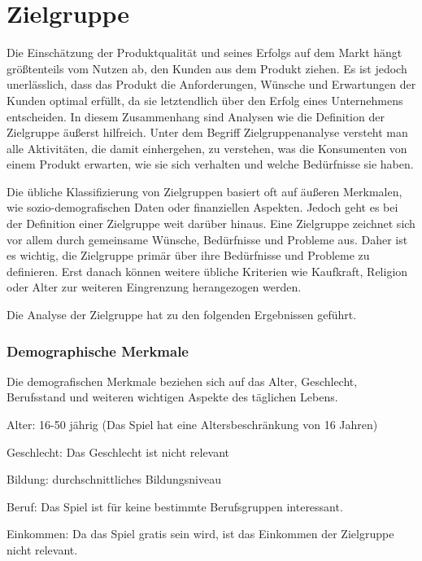 
\section{Zielgruppe}\label{sec:zielgruppe}

\renewcommand{\kapitelautor}{Autor: Nils Hubmann}

%
Die Einschätzung der Produktqualität und seines Erfolgs auf dem Markt hängt größtenteils vom Nutzen ab, den Kunden aus dem Produkt ziehen.
Es ist jedoch unerlässlich, dass das Produkt die Anforderungen, Wünsche und Erwartungen der Kunden optimal erfüllt, da sie letztendlich über den Erfolg eines Unternehmens entscheiden.
In diesem Zusammenhang sind Analysen wie die Definition der Zielgruppe äußerst hilfreich.
Unter dem Begriff Zielgruppenanalyse versteht man alle Aktivitäten, die damit einhergehen, zu verstehen, was die Konsumenten von einem Produkt erwarten, wie sie sich verhalten und welche Bedürfnisse sie haben.


Die übliche Klassifizierung von Zielgruppen basiert oft auf äußeren Merkmalen, wie sozio-demografischen Daten oder finanziellen Aspekten.
Jedoch geht es bei der Definition einer Zielgruppe weit darüber hinaus.
Eine Zielgruppe zeichnet sich vor allem durch gemeinsame Wünsche, Bedürfnisse und Probleme aus.
Daher ist es wichtig, die Zielgruppe primär über ihre Bedürfnisse und Probleme zu definieren.
Erst danach können weitere übliche Kriterien wie Kaufkraft, Religion oder Alter zur weiteren Eingrenzung herangezogen werden. 

Die Analyse der Zielgruppe hat zu den folgenden Ergebnissen geführt.

\subsubsection{Demographische Merkmale}\label{subsubsec:Demographische-Merkmale}

Die demografischen Merkmale beziehen sich auf das Alter, Geschlecht, Berufsstand und weiteren wichtigen Aspekte des täglichen Lebens.

\begin{liste}
    \item Alter: 16-50 jährig (Das Spiel hat eine Altersbeschränkung von 16 Jahren)
    \item Geschlecht: Das Geschlecht ist nicht relevant
    \item Bildung: durchschnittliches Bildungsniveau
    \item Beruf: Das Spiel ist für keine bestimmte Berufsgruppen interessant.
    \item Einkommen: Da das Spiel gratis sein wird, ist das Einkommen der Zielgruppe nicht relevant.
\end{liste}

